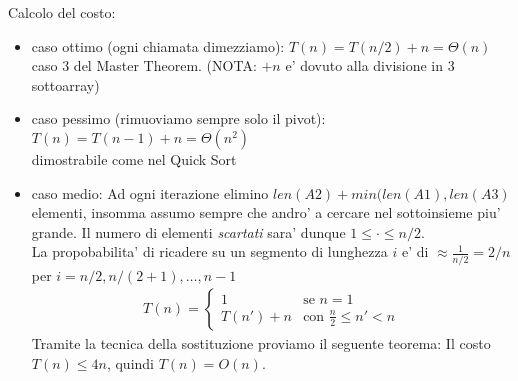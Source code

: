 \documentclass{article}
\begin{document}
Calcolo del costo:
\begin{itemize}
  \item caso ottimo (ogni chiamata dimezziamo): $T(n) = T(n/2) + n = \Theta(n)$ \\
    caso 3 del Master Theorem. (NOTA: $+ n$ e' dovuto alla divisione in 3 sottoarray)
  \item caso pessimo (rimuoviamo sempre solo il pivot): $T(n) = T(n-1) + n = \Theta(n^2)$ \\
    dimostrabile come nel Quick Sort
  \item caso medio: Ad ogni iterazione elimino $len(A2) + min(len(A1), len(A3)$
  elementi, insomma assumo sempre che andro' a cercare nel sottoinsieme piu' grande.
  Il numero di elementi \emph{scartati} sara' dunque $1 \leq \cdot \leq n/2$. \\
  La propobabilita' di ricadere su un segmento di lunghezza $i$ e' di
    $\approx \frac{1}{n/2} = 2/n$ per $i=n/2, n/(2+1), \ldots, n-1$
  \begin{align*}
    T(n) = \begin{cases}
      1 &\text{se } n = 1 \\
      T(n') + n &\text{con } \frac{n}{2} \leq n' < n
    \end{cases}
  \end{align*}
  Tramite la tecnica della sostituzione proviamo il seguente teorema:
  Il costo $T(n) \leq 4n$, quindi $T(n) = O(n)$.
\end{itemize}
\end{document}
